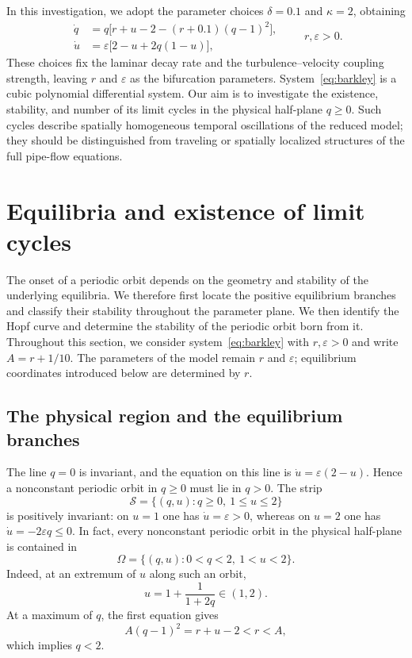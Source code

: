 \documentclass[11pt,reqno]{amsart}
\theoremstyle{plain}
\theoremstyle{definition}
\theoremstyle{remark}
\begin{document}
In this investigation, we adopt the parameter choices
$\delta=0.1$ and $\kappa=2$, obtaining
\begin{equation}
\begin{aligned}
\dot q
&=q\bigl[r+u-2-(r+0.1)(q-1)^2\bigr],\\
\dot u
&=\varepsilon\bigl[2-u+2q(1-u)\bigr],
\end{aligned}
\qquad r,\varepsilon>0.
\label{eq:barkley}
\end{equation}
These choices fix the laminar decay rate and the
turbulence--velocity coupling strength, leaving $r$ and
$\varepsilon$ as the bifurcation parameters.
System~\eqref{eq:barkley} is a cubic polynomial differential
system. Our aim is to investigate the existence, stability,
and number of its limit cycles in the physical half-plane
$q\geq0$. Such cycles describe spatially homogeneous temporal
oscillations of the reduced model; they should be distinguished
from traveling or spatially localized structures of the
full pipe-flow equations.

\section{Equilibria and existence of limit cycles}
\label{sec:barkley-cycles}

The onset of a periodic orbit depends on the geometry and stability
of the underlying equilibria. We therefore first locate the positive
equilibrium branches and classify their stability throughout the
parameter plane. We then identify the Hopf curve and determine the
stability of the periodic orbit born from it. Throughout this section,
we consider system~\eqref{eq:barkley} with $r,\varepsilon>0$ and write
$A=r+1/10$. The parameters of the model remain $r$ and $\varepsilon$;
equilibrium coordinates introduced below are determined by $r$.

\subsection{The physical region and the equilibrium branches}
\label{subsec:bl-equilibria}

The line $q=0$ is invariant, and the equation on this line is
$\dot u=\varepsilon(2-u)$. Hence a nonconstant periodic orbit in
$q\geq0$ must lie in $q>0$. The strip
\[
\mathcal S
=
\{(q,u):q\geq0,\ 1\leq u\leq2\}
\]
is positively invariant: on $u=1$ one has $\dot u=\varepsilon>0$,
whereas on $u=2$ one has $\dot u=-2\varepsilon q\leq0$.
In fact, every nonconstant periodic orbit in the physical half-plane
is contained in
\begin{equation}
\Omega
=
\{(q,u):0<q<2,\ 1<u<2\}.
\label{eq:bl-periodic-region}
\end{equation}
Indeed, at an extremum of $u$ along such an orbit,
\[
u=1+\frac{1}{1+2q}\in(1,2).
\]
At a maximum of $q$, the first equation gives
\[
A(q-1)^2=r+u-2<r<A,
\]
which implies $q<2$.
\end{document}
